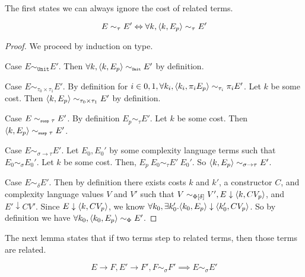 The first states we can always ignore the cost of related terms.
%
\begin{lemma}
  \label{lem:ignorecost}
\[
  E \sim_\tau E' \Leftrightarrow \forall k, \langle k, E_p \rangle \sim_\tau E'
\]
\end{lemma}
%
\begin{proof}
  We proceed by induction on type.

  Case $E \sim_{\texttt{Unit}} E'$.
  Then $\forall k, \langle k, E_p \rangle \sim_{\texttt{\tiny{Unit}}} E'$ by definition.

  Case $E \sim_{\tau_0 \times \tau_1} E'$.
  By definition for $i\in{0,1}, \forall k_i, \langle k_i, \pi_i E_p \rangle \sim_{\tau_i} \pi_i E'$.
  Let $k$ be some cost.
  Then $\langle k, E_p \rangle \sim_{\tau_0 \times \tau_1} E'$ by definition.

  Case $E \sim_{\texttt{\tiny{susp }} \tau} E'$.
  By definition $E_p \sim_\tau E'$.
  Let $k$ be some cost.
  Then $\langle k, E_p \rangle \sim_{\texttt{\tiny{susp }} \tau} E'$.

  Case $E \sim_{\sigma \to \tau} E'$.
  Let $E_0, E_0'$ by some complexity language terms such that $E_0 \sim_\sigma E_0'$.
  Let $k$ be some cost.
  Then, $E_p\ E_0 \sim_\tau E'\ E_0'$.
  So $\langle k, E_p \rangle \sim_{\sigma \to \tau} E'$.

  Case $E \sim_\delta E'$.
  Then by definition there exists costs $k$ and $k'$, a constructor $C$, and complexity language values $V$ and $V'$ such that $V \sim_{\Phi[\delta]} V', E \downarrow \langle k, C V_p \rangle$, and $E' \downarrow C V'$.
  Since $E \downarrow \langle k, C V_p \rangle$, we know $\forall k_0, \exists k_0'. \langle k_0, E_p \rangle \downarrow \langle k_0', C V_p \rangle$.
  So by definition we have $\forall k_0, \langle k_0, E_p \rangle \sim_\Phi E'$.
\end{proof}
%
The next lemma states that if two terms step to related terms, then those terms are related.
%
\begin{lemma}
  \label{lem:relatedstepback}
  \[
    E \to F, E' \to F', F \sim_\sigma F' \implies E \sim_\sigma E'
  \]
\end{lemma}
%
